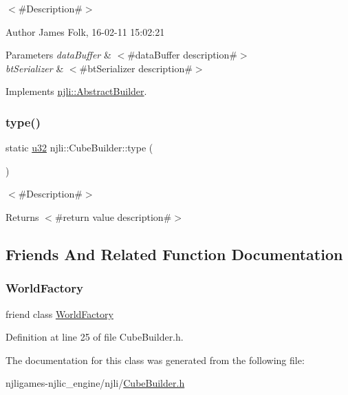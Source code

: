 $<$\#\+Description\#$>$ 

\begin{DoxyAuthor}{Author}
James Folk, 16-\/02-\/11 15\+:02\+:21
\end{DoxyAuthor}

\begin{DoxyParams}{Parameters}
{\em data\+Buffer} & $<$\#data\+Buffer description\#$>$ \\
\hline
{\em bt\+Serializer} & $<$\#bt\+Serializer description\#$>$ \\
\hline
\end{DoxyParams}


Implements \mbox{\hyperlink{classnjli_1_1_abstract_builder_ab66b774e02ccb9da554c9aab7fa6d981}{njli\+::\+Abstract\+Builder}}.

\mbox{\label{classnjli_1_1_cube_builder_a441cbddc56597d9bee9e9334bcf78762}} 
\subsubsection{\texorpdfstring{type()}{type()}}
{\footnotesize\ttfamily static \mbox{\hyperlink{_util_8h_a10e94b422ef0c20dcdec20d31a1f5049}{u32}} njli\+::\+Cube\+Builder\+::type (\begin{DoxyParamCaption}{ }\end{DoxyParamCaption})\hspace{0.3cm}{\ttfamily [static]}}

$<$\#\+Description\#$>$

\begin{DoxyReturn}{Returns}
$<$\#return value description\#$>$ 
\end{DoxyReturn}


\subsection{Friends And Related Function Documentation}
\mbox{\label{classnjli_1_1_cube_builder_acb96ebb09abe8f2a37a915a842babfac}} 
\subsubsection{\texorpdfstring{World\+Factory}{WorldFactory}}
{\footnotesize\ttfamily friend class \mbox{\hyperlink{classnjli_1_1_world_factory}{World\+Factory}}\hspace{0.3cm}{\ttfamily [friend]}}



Definition at line 25 of file Cube\+Builder.\+h.



The documentation for this class was generated from the following file\+:\begin{DoxyCompactItemize}
\item 
njligames-\/njlic\+\_\+engine/njli/\mbox{\hyperlink{_cube_builder_8h}{Cube\+Builder.\+h}}\end{DoxyCompactItemize}
